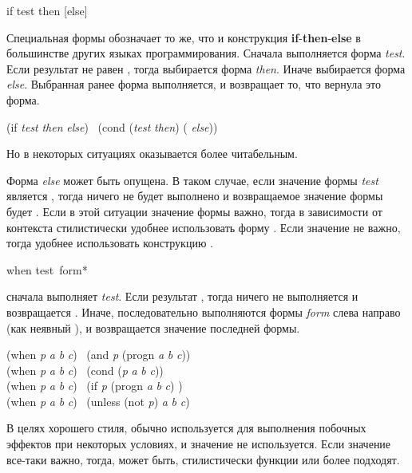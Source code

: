 \begin{defspec}
if test then [else]

Специальная формы  обозначает то же, что и конструкция
\textbf{if}-\textbf{then}-\textbf{else} в большинстве других языках
программирования.
Сначала выполняется форма \emph{test}. Если результат не равен {\false}, тогда
выбирается форма \emph{then}. Иначе выбирается форма \emph{else}.
Выбранная ранее форма выполняется, и  возвращает то, что вернула это
форма.
\begin{lisp}
(if \emph{test} \emph{then} \emph{else}) \EQ\ (cond (\emph{test} \emph{then}) ({\true} \emph{else}))
\end{lisp}
Но в некоторых ситуациях  оказывается более читабельным.

Форма \emph{else} может быть опущена. В таком случае, если значение формы
\emph{test} является {\false}, тогда ничего не будет выполнено и возвращаемое
значение формы  будет {\false}.
Если в этой ситуации значение формы  важно, тогда в зависимости от
контекста стилистически удобнее использовать форму .
Если значение не важно, тогда удобнее использовать конструкцию .
\end{defspec}

\begin{defmac}
when test {\,form}*

сначала выполняет \emph{test}. Если результат {\false}, тогда ничего не
выполняется и возвращается {\false}.
Иначе, последовательно выполняются формы \emph{form}
слева направо (как неявный ), и возвращается значение последней
формы.
\begin{lisp}
(when \emph{p} \emph{a} \emph{b} \emph{c}) \EQ\ (and \emph{p} (progn \emph{a} \emph{b} \emph{c})) \\
(when \emph{p} \emph{a} \emph{b} \emph{c}) \EQ\ (cond (\emph{p} \emph{a} \emph{b} \emph{c})) \\
(when \emph{p} \emph{a} \emph{b} \emph{c}) \EQ\ (if \emph{p} (progn \emph{a} \emph{b} \emph{c}) {\false}) \\
(when \emph{p} \emph{a} \emph{b} \emph{c}) \EQ\ (unless (not \emph{p}) \emph{a} \emph{b} \emph{c})
\end{lisp}
В целях хорошего стиля,  обычно используется для выполнения побочных
эффектов при некоторых условиях, и значение  не используется.
Если значение все-таки важно, тогда, может быть, стилистически функции
 или  более подходят.
\end{defmac}

